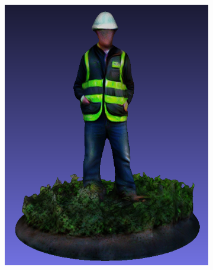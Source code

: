 \begin{figure}[H]
\begin{subfigure}[b]{0.2567\textwidth}
        \includegraphics[width=\textwidth]{etc/bias/bias_engineer_genie_2.png}
        \caption{}
    \end{subfigure}
    \begin{subfigure}[b]{0.198\textwidth}
        \centering

\end{subfigure}
\end{figure}
